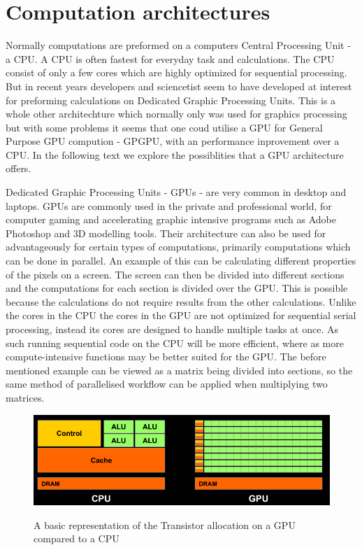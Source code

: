 \section{Computation architectures}
\label{sec:comparch}
Normally computations are preformed on a computers Central Processing Unit - a CPU.
A CPU is often fastest for everyday task and calculations.
The CPU consist of only a few cores which are highly optimized for sequential processing.\citep{whatisgpu}
But in recent years developers and sciencetist seem to have developed at interest for preforming calculations on Dedicated Graphic Processing Units.\citep{gpurise}
This is a whole other architechture which normally only was used for graphics processing but with some problems it seems that one coud utilise a GPU for General Purpose GPU compution - GPGPU, with an performance inprovement over a CPU.
In the following text we explore the possiblities that a GPU architecture offers.

Dedicated Graphic Processing Units - GPUs - are very common in desktop and laptops. \citep{STEAMHW}
GPUs are commonly used in the private and professional world, for computer gaming and accelerating graphic intensive programs such as Adobe Photoshop and 3D modelling tools. \citep{NVIDIAADOBE}
Their architecture can also be used for advantageously for certain types of computations, primarily computations which can be done in parallel. 
An example of this can be calculating different properties of the pixels on a screen. 
The screen can then be divided into different sections and the computations for each section is divided over the GPU.
This is possible because the calculations do not require results from the other calculations.
Unlike the cores in the CPU the cores in the GPU are not optimized for sequential serial processing, instead its cores are designed to handle multiple tasks at once. 
As such running sequential code on the CPU will be more efficient, where as more compute-intensive functions may be better suited for the GPU.\citep{NvidiaGPGPU}
The before mentioned example can be viewed as a matrix being divided into sections, so the same method of parallelised workflow can be applied when multiplying two matrices.

\begin{figure}[h!]
\centering
 \includegraphics[width=1\textwidth]{figures/GPUCPUimage.png} %
\caption{A basic representation of the Transistor allocation on a GPU compared to a CPU}\label{image:GPUCPUimage}\citep{NvidiaCUDASeminar}
\vspace{-15pt}
\end{figure}

